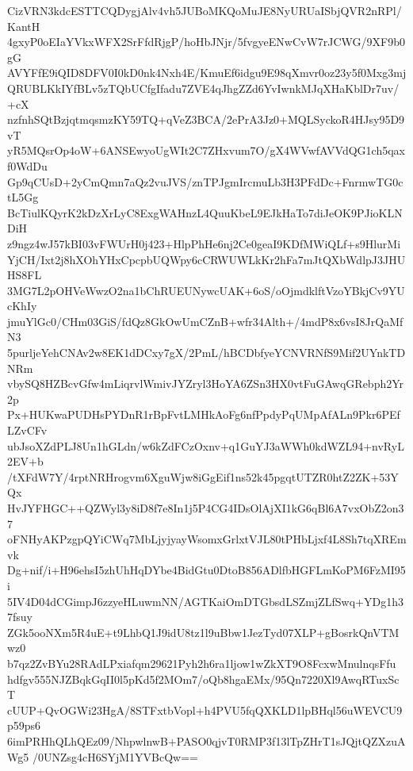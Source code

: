 CizVRN3kdcESTTCQDygjAlv4vh5JUBoMKQoMuJE8NyURUaISbjQVR2nRPl/KantH
4gxyP0oEIaYVkxWFX2SrFfdRjgP/hoHbJNjr/5fvgyeENwCvW7rJCWG/9XF9b0gG
AVYFfE9iQID8DFV0I0kD0nk4Nxh4E/KmuEf6idgu9E98qXmvr0oz23y5f0Mxg3mj
QRUBLKkIYfBLv5zTQbUCfgIfadu7ZVE4qJhgZZd6YvIwnkMJqXHaKblDr7uv/+cX
nzfnhSQtBzjqtmqsmzKY59TQ+qVeZ3BCA/2ePrA3Jz0+MQLSyckoR4HJsy95D9vT
yR5MQsrOp4oW+6ANSEwyoUgWIt2C7ZHxvum7O/gX4WVwfAVVdQG1ch5qaxf0WdDu
Gp9qCUsD+2yCmQmn7aQz2vuJVS/znTPJgmIrcmuLb3H3PFdDc+FnrmwTG0ctL5Gg
BcTiulKQyrK2kDzXrLyC8ExgWAHnzL4QuuKbeL9EJkHaTo7diJeOK9PJioKLNDiH
z9ngz4wJ57kBI03vFWUrH0j423+HlpPhHe6nj2Ce0geaI9KDfMWiQLf+s9HlurMi
YjCH/Ixt2j8hXOhYHxCpcpbUQWpy6cCRWUWLkKr2hFa7mJtQXbWdlpJ3JHUHS8FL
3MG7L2pOHVeWwzO2na1bChRUEUNywcUAK+6oS/oOjmdklftVzoYBkjCv9YUcKhIy
jmuYlGc0/CHm03GiS/fdQz8GkOwUmCZnB+wfr34Alth+/4mdP8x6vsI8JrQaMfN3
5purljeYehCNAv2w8EK1dDCxy7gX/2PmL/hBCDbfyeYCNVRNfS9Mif2UYnkTDNRm
vbySQ8HZBcvGfw4mLiqrvlWmivJYZryl3HoYA6ZSn3HX0vtFuGAwqGRebph2Yr2p
Px+HUKwaPUDHsPYDnR1rBpFvtLMHkAoFg6nfPpdyPqUMpAfALn9Pkr6PEfLZvCFv
ubJsoXZdPLJ8Un1hGLdn/w6kZdFCzOxnv+q1GuYJ3aWWh0kdWZL94+nvRyL2EV+b
/tXFdW7Y/4rptNRHrogvm6XguWjw8iGgEif1ns52k45pgqtUTZR0htZ2ZK+53YQx
HvJYFHGC++QZWyl3y8iD8f7e8In1j5P4CG4IDsOlAjXI1kG6qBl6A7vxObZ2on37
oFNHyAKPzgpQYiCWq7MbLjyjyayWsomxGrlxtVJL80tPHbLjxf4L8Sh7tqXREmvk
Dg+nif/i+H96ehsI5zhUhHqDYbe4BidGtu0DtoB856ADlfbHGFLmKoPM6FzMI95i
5IV4D04dCGimpJ6zzyeHLuwmNN/AGTKaiOmDTGbsdLSZmjZLfSwq+YDg1h37fsuy
ZGk5ooNXm5R4uE+t9LhbQ1J9idU8tz1l9uBbw1JezTyd07XLP+gBosrkQnVTMwz0
b7qz2ZvBYu28RAdLPxiafqm29621Pyh2h6ra1ljow1wZkXT9O8FcxwMnulnqsFfu
hdfgv555NJZBqkGqII0l5pKd5f2MOm7/oQb8hgaEMx/95Qn7220Xl9AwqRTuxScT
cUUP+QvOGWi23HgA/8STFxtbVopl+h4PVU5fqQXKLD1lpBHql56uWEVCU9p59ps6
6imPRHhQLhQEz09/NhpwlnwB+PASO0qjvT0RMP3f13lTpZHrT1sJQjtQZXzuAWg5
/0UNZsg4cH6SYjM1YVBcQw==
